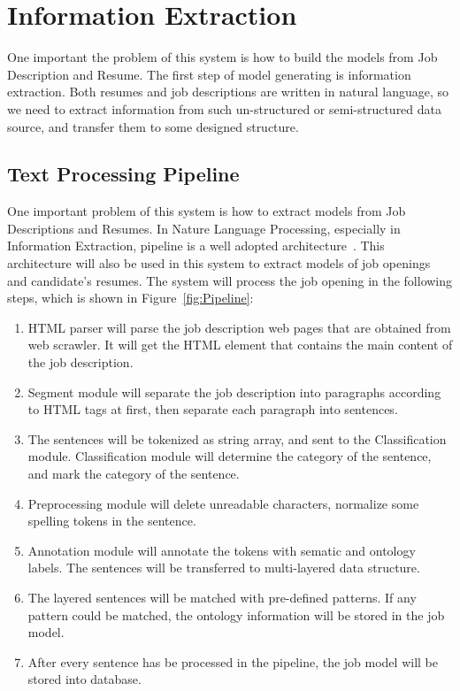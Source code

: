 \chapter{Information Extraction}


One important the problem of this system is how to build the models from Job Description and Resume. The first step of model generating is information extraction. Both resumes and job descriptions are written in natural language, so we need to extract information from such un-structured or semi-structured data source, and transfer them to some designed structure.

\section{Text Processing Pipeline}

One important problem of this system is how to extract models from Job Descriptions and Resumes.
In Nature Language Processing, especially in Information Extraction, pipeline is a well adopted architecture~\cite{sarawagi2008information}. This architecture will also be used in this system to extract models of job openings and candidate's resumes. The system will process the job opening in the following steps, which is shown in Figure~\ref{fig:Pipeline}:

\begin{enumerate}
    \item HTML parser will parse the job description web pages that are obtained from web scrawler. It will get the HTML element that contains the main content of the job description.
    \item Segment module will separate the job description into paragraphs according to HTML tags at first, then separate each paragraph into sentences.
    \item The sentences will be tokenized as string array, and sent to the Classification module. Classification module will determine the category of the sentence, and mark the category of the sentence.
    \item Preprocessing module will delete unreadable characters, normalize some spelling tokens in the sentence.
    \item Annotation module will annotate the tokens with sematic and ontology labels. The sentences will be transferred to multi-layered data structure.
    \item The layered sentences will be matched with pre-defined patterns. If any pattern could be matched, the ontology information will be stored in the job model.
    \item After every sentence has be processed in the pipeline, the job model will be stored into database.
\end{enumerate}


